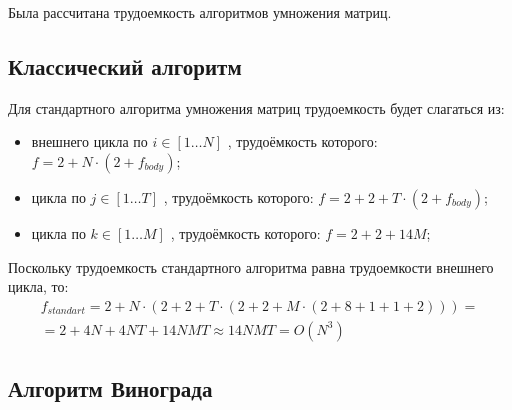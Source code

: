 Была рассчитана трудоемкость алгоритмов умножения матриц.

\subsection{Классический алгоритм}

Для стандартного алгоритма умножения матриц трудоемкость будет слагаться из:

\begin{itemize}
	\item внешнего цикла по $i \in [1 \ldots N]$ , трудоёмкость которого: $f = 2 + N \cdot (2 + f_{body})$;
	\item цикла по $j \in [1 \ldots T]$ , трудоёмкость которого: $f = 2 + 2 + T \cdot (2 + f_{body})$;
	\item цикла по $k \in [1 \ldots M]$ , трудоёмкость которого: $f = 2 + 2 + 14M$;
\end{itemize}

Поскольку трудоемкость стандартного алгоритма равна трудоемкости внешнего цикла, то:
\begin{equation}
	\label{сomplexity:standart}
	\begin{aligned}
		f_{standart} = 2 + N \cdot (2 + 2 + T \cdot (2 + 2 + M \cdot (2 + 8 + 1 + 1 + 2)))= \\
		= 2 + 4N + 4NT + 14NMT \approx 14NMT = O(N^3)
	\end{aligned}
\end{equation}

\clearpage

\subsection{Алгоритм Винограда}


